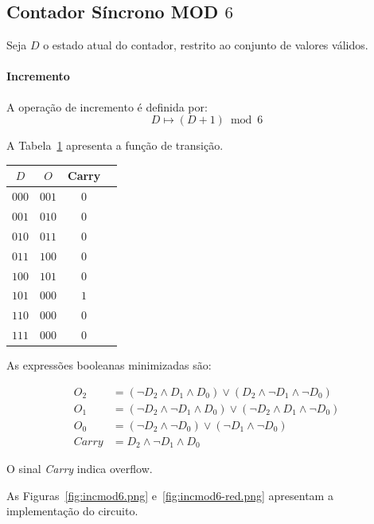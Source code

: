 \subsection{Contador Síncrono MOD $6$}

Seja $D$ o estado atual do contador, restrito ao conjunto de valores válidos.

\paragraph{Incremento}
A operação de incremento é definida por:
\[
D \mapsto (D + 1) \bmod 6
\]

A Tabela~\ref{tab:inc_mod6} apresenta a função de transição.

\begin{table} [H] \label{tab:inc_mod6}
\begin{center}
\begin{tabular}{c|ccc}
    $D$ & $O$ & Carry \\
    \hline
    $000$ & $001$ & $0$ \\
    $001$ & $010$ & $0$ \\
    $010$ & $011$ & $0$ \\
    $011$ & $100$ & $0$ \\
    $100$ & $101$ & $0$ \\
    $101$ & $000$ & $1$ \\
    $110$ & $000$ & $0$ \\
    $111$ & $000$ & $0$ \\    
\end{tabular}
\end{center}
\end{table}
    

As expressões booleanas minimizadas são:

\begin{align*}
    O_2 &= (\lnot D_2 \land D_1 \land D_0) \lor (D_2 \land \lnot D_1 \land \lnot D_0) \\[4pt]
    O_1 &= (\lnot D_2 \land \lnot D_1 \land D_0) \lor (\lnot D_2 \land D_1 \land \lnot D_0) \\[4pt]
    O_0 &= (\lnot D_2 \land \lnot D_0) \lor (\lnot D_1 \land \lnot D_0) \\[4pt]
    Carry &= D_2 \land \lnot D_1 \land D_0
\end{align*}


O sinal \textit{Carry} indica overflow.

As Figuras~\ref{fig:incmod6.png} e~\ref{fig:incmod6-red.png} apresentam a implementação do circuito.

